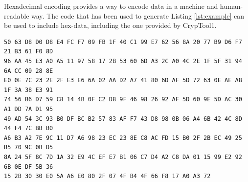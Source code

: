 \documentclass[]{scrartcl}
\newcommand{\ctone}{CrypTool1}
\begin{document}
Hexadecimal encoding provides a way to encode data in a machine and human-readable way. The code that has been used to generate Listing \ref{lst:example} can be used to include hex-data, including the one provided by \ctone{}. 
\begin{lstlisting}[style=plusStyle, caption={Example for how to include hex-data.},basicstyle=\tiny\ttfamily,label=lst:example]
50 63 D8 D0 D8 E4 FC F7 09 FB 1F 40 C1 99 E7 62 56 8A 20 77 B9 D6 F7 21 B3 61 F0 8D
96 AA 45 E3 A0 A5 11 97 58 17 2B 53 60 6D A3 2C A0 4C 2E 1F 5F 31 94 6A CC 09 28 8E
E0 0E 7C 23 2E 2F E3 E6 6A 02 AA D2 A7 41 80 6D AF 5D 72 63 0E AE A8 1F 3A 38 E3 91
74 56 B6 D7 59 C8 14 4B 0F C2 D8 9F 46 98 26 92 AF 5D 60 9E 5D AC 30 A1 DD 7A D1 95
49 AD 54 3C 93 B0 DF BC B2 57 83 AF F7 43 D8 98 0B 06 A4 6B 42 4C 8D 44 F4 7C BB B0
A6 B3 A2 7E 9C 11 D7 A6 98 23 EC 23 8E C8 AC FD 15 B0 2F 2B EC 49 25 B5 70 9C 0B D5
8A 24 5F 8C 7D 1A 32 E9 4C EF E7 B1 06 C7 D4 A2 C8 DA 01 15 99 E2 92 6B 0E DF 5B 36
15 2B 30 30 E0 5A A6 E0 80 2F 07 4F B4 4F 66 F8 17 A0 A3 72
\end{lstlisting}
\end{document}
